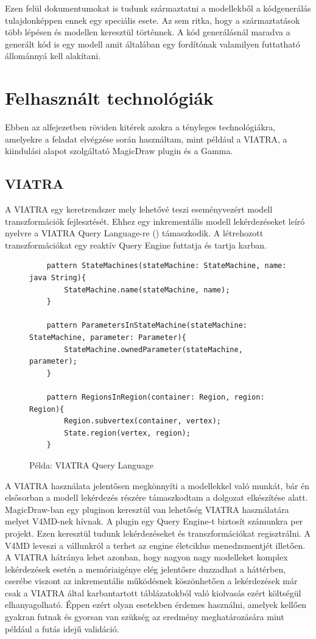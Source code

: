 Ezen felül dokumentumokat is tudunk származtatni a modellekből a kódgenerálás tulajdonképpen ennek egy speciális esete. Az sem ritka, hogy a származtatások több lépésen és modellen keresztül történnek. A kód generálásnál maradva a generált kód is egy modell amit általában egy fordítónak valamilyen futtatható állománnyá kell alakítani.


\section{Felhasznált technológiák}

Ebben az alfejezetben röviden kitérek azokra a tényleges  technológiákra, amelyekre a feladat elvégzése során használtam, mint például a VIATRA, a kiindulási alapot szolgáltató MagicDraw plugin és a Gamma.

\subsection[]{VIATRA\footnotemark}

A VIATRA egy keretrendszer mely lehetővé teszi eseményvezért modell transzformációk fejlesztését. Ehhez egy inkrementális modell lekérdezéseket leíró nyelvre a VIATRA Query Language-re () támaszkodik. A létrehozott transzformációkat egy reaktív Query Engine futtatja és tartja karban.

\begin{figure}[!ht]
	\begin{lstlisting}
	pattern StateMachines(stateMachine: StateMachine, name: java String){
	    StateMachine.name(stateMachine, name);
	}
	
	pattern ParametersInStateMachine(stateMachine: StateMachine, parameter: Parameter){
    	StateMachine.ownedParameter(stateMachine, parameter);
	}
	
	pattern RegionsInRegion(container: Region, region: Region){
	    Region.subvertex(container, vertex);
    	State.region(vertex, region);
	}
	\end{lstlisting}
	\caption{Példa: VIATRA Query Language}
	\label{fig:vql}
\end{figure}


A VIATRA használata jelentősen megkönnyíti a modellekkel való munkát, bár én elsősorban a modell lekérdezés részére támaszkodtam a dolgozat elkészítése alatt. MagicDraw-ban egy pluginon keresztül van lehetőség VIATRA használatára melyet V4MD-nek hívnak. A plugin egy Query Engine-t biztosít számunkra per projekt. Ezen keresztül tudunk lekérdezéseket és transzformációkat regisztrálni. A V4MD leveszi a vállunkról a terhet az engine életciklus menedzsmentjét illetően. A VIATRA hátránya lehet azonban, hogy nagyon nagy modelleket komplex lekérdezések esetén a memóriaigénye elég jelentősre duzzadhat a háttérben, cserébe viszont az inkrementális működésnek köszönhetően a lekérdezések már csak a VIATRA által karbantartott táblázatokból való kiolvasás ezért költségül elhanyagolható. Éppen ezért olyan esetekben érdemes használni, amelyek kellően gyakran futnak és gyorsan van szükség az eredmény meghatározására mint például a futás idejű validáció.

